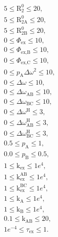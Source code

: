 \documentclass[a4paper,11pt,twoside,openright]{book}
\def\lthtmlcheckvsize{\ifdim\ht\sizebox<\vsize 
  \ifdim\wd\sizebox<\hsize\expandafter\hfill\fi \expandafter\vfill
  \else\expandafter\vss\fi}%
\begin{document}
{\newpage\clearpage
\setcounter{equation}{90}
%
\begin{subequations}\begin{gather}
5 \leqslant \mathrm{R}_2^0\leqslant 20, \\
5 \leqslant \mathrm{R}_{\mathrm{2A}}^0\leqslant 20, \\
5 \leqslant \mathrm{R}_{\mathrm{2B}}^0\leqslant 20, \\
0 \leqslant \Phi_{\textrm{ex}}\leqslant 10, \\
0 \leqslant \Phi_{\textrm{ex,B}}\leqslant 10, \\
0 \leqslant \Phi_{\textrm{ex,C}}\leqslant 10, \\
0 \leqslant p_{\textrm{A}}\Delta\omega ^2 \leqslant 10, \\
0 \leqslant \Delta\omega \leqslant 10, \\
0 \leqslant \Delta\omega_{\textrm{AB}}\leqslant 10, \\
0 \leqslant \Delta\omega_{\textrm{BC}}\leqslant 10, \\
0 \leqslant \Delta\omega^{\scriptscriptstyle\mathrm{H}}\leqslant 3, \\
0 \leqslant \Delta\omega^{\scriptscriptstyle\mathrm{H}}_{\textrm{AB}}\leqslant 3, \\
0 \leqslant \Delta\omega^{\scriptscriptstyle\mathrm{H}}_{\textrm{BC}}\leqslant 3, \\
0.5 \leqslant p_{\textrm{A}}\leqslant 1, \\
0.0 \leqslant p_{\textrm{B}}\leqslant 0.5, \\
1 \leqslant \textrm{k}_{\textrm{ex}}\leqslant 1e^4, \\
1 \leqslant \textrm{k}_{\textrm{ex}}^{\textrm{AB}}\leqslant 1e^4, \\
1 \leqslant \textrm{k}_{\textrm{ex}}^{\textrm{BC}}\leqslant 1e^4, \\
1 \leqslant \textrm{k}_{\textrm{A}}\leqslant 1e^4, \\
1 \leqslant \textrm{k}_{\textrm{B}}\leqslant 1e^4, \\
0.1 \leqslant \textrm{k}_{\textrm{AB}}\leqslant 20, \\
1e^{-4} \leqslant \tau_{\textrm{ex}}\leqslant 1.
\end{gather}\end{subequations}%
\lthtmldisplayZ
\lthtmlcheckvsize\clearpage}
\end{document}
